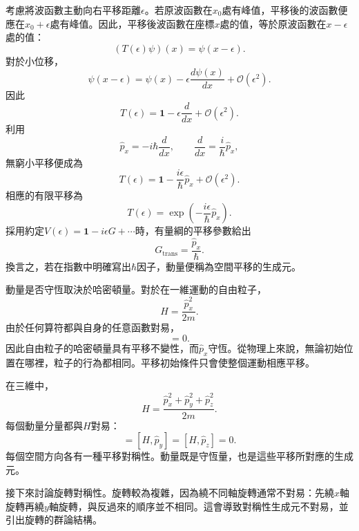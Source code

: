 考慮將波函數主動向右平移距離\(\epsilon\)。若原波函數在\(x_0\)處有峰值，平移後的波函數便應在\(x_0+\epsilon\)處有峰值。因此，平移後波函數在座標\(x\)處的值，等於原波函數在\(x-\epsilon\)處的值：
\begin{equation}
(T(\epsilon)\psi)(x)=\psi(x-\epsilon).
\end{equation}
對於小位移，
\begin{equation}
\psi(x-\epsilon)
=
\psi(x)-\epsilon\frac{d\psi(x)}{dx}
+\mathcal O(\epsilon^2).
\end{equation}
因此
\begin{equation}
T(\epsilon)
=
\mathbf 1-\epsilon\frac{d}{dx}
+\mathcal O(\epsilon^2).
\end{equation}
利用
\begin{equation}
\hat p_x=-i\hbar\frac{d}{dx},
\qquad
\frac{d}{dx}=\frac{i}{\hbar}\hat p_x,
\end{equation}
無窮小平移便成為
\begin{equation}
T(\epsilon)
=
\mathbf 1-\frac{i\epsilon}{\hbar}\hat p_x
+\mathcal O(\epsilon^2).
\end{equation}
相應的有限平移為
\begin{equation}
T(\epsilon)
=
\exp\left(-\frac{i\epsilon}{\hbar}\hat p_x\right).
\end{equation}
採用約定\(V(\epsilon)=\mathbf 1-i\epsilon G+\cdots\)時，有量綱的平移參數給出
\begin{equation}
G_{\mathrm{trans}}=\frac{\hat p_x}{\hbar}.
\end{equation}
換言之，若在指數中明確寫出\(\hbar\)因子，動量便稱為空間平移的生成元。

\begin{classroomqa}
\end{classroomqa}

動量是否守恆取決於哈密頓量。對於在一維運動的自由粒子，
\begin{equation}
H=\frac{\hat p_x^2}{2m}.
\end{equation}
由於任何算符都與自身的任意函數對易，
\begin{equation}
[H,\hat p_x]=0.
\end{equation}
因此自由粒子的哈密頓量具有平移不變性，而\(\hat p_x\)守恆。從物理上來說，無論初始位置在哪裡，粒子的行為都相同。平移初始條件只會使整個運動相應平移。

在三維中，
\begin{equation}
H
=
\frac{\hat p_x^2+\hat p_y^2+\hat p_z^2}{2m}.
\end{equation}
每個動量分量都與\(H\)對易：
\begin{equation}
[H,\hat p_x]=[H,\hat p_y]=[H,\hat p_z]=0.
\end{equation}
每個空間方向各有一種平移對稱性。動量既是守恆量，也是這些平移所對應的生成元。

接下來討論旋轉對稱性。旋轉較為複雜，因為繞不同軸旋轉通常不對易：先繞\(x\)軸旋轉再繞\(y\)軸旋轉，與反過來的順序並不相同。這會導致對稱性生成元不對易，並引出旋轉的群論結構。
